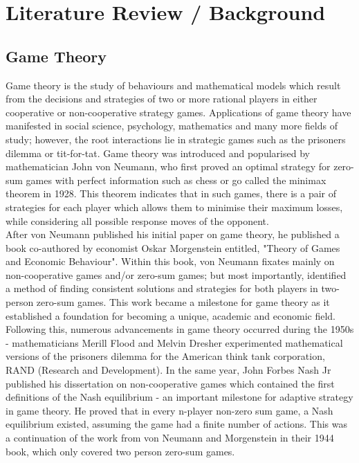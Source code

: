 \documentclass[11pt, a4paper]{article}
\title{\vspace{-7cm}}
\author{}
\date{}
\begin{document}
\maketitle

\section{Literature Review / Background}

\subsection{Game Theory}
Game theory is the study of behaviours and mathematical models which result from the decisions and strategies of two or more rational players in either cooperative or non-cooperative strategy games. Applications of game theory have manifested in social science, psychology, mathematics and many more fields of study; however, the root interactions lie in strategic games such as the prisoners dilemma or tit-for-tat. Game theory was introduced and popularised by mathematician John von Neumann, who first proved an optimal strategy for zero-sum games with perfect information such as chess or go called the minimax theorem in 1928. This theorem indicates that in such games, there is a pair of strategies for each player which allows them to minimise their maximum losses, while considering all possible response moves of the opponent. \\
\noindent
After von Neumann published his initial paper on game theory, he published a book co-authored by economist Oskar Morgenstein entitled, "Theory of Games and Economic Behaviour". Within this book, von Neumann fixates mainly on non-cooperative games and/or zero-sum games; but most importantly, identified a method of finding consistent solutions and strategies for both players in two-person zero-sum games. This work became a milestone for game theory as it established a foundation for becoming a unique, academic and economic field. \\
\noindent
Following this, numerous advancements in game theory occurred during the 1950s - mathematicians Merill Flood and Melvin Dresher experimented mathematical versions of the prisoners dilemma for the American think tank corporation, RAND (Research and Development). In the same year, John Forbes Nash Jr published his dissertation on non-cooperative games which contained the first definitions of the Nash equilibrium - an important milestone for adaptive strategy in game theory. He proved that in every n-player non-zero sum game, a Nash equilibrium existed, assuming the game had a finite number of actions. This was a continuation of the work from von Neumann and Morgenstein in their 1944 book, which only covered two person zero-sum games. \\
\noindent


\noindent

\clearpage
\end{document}
